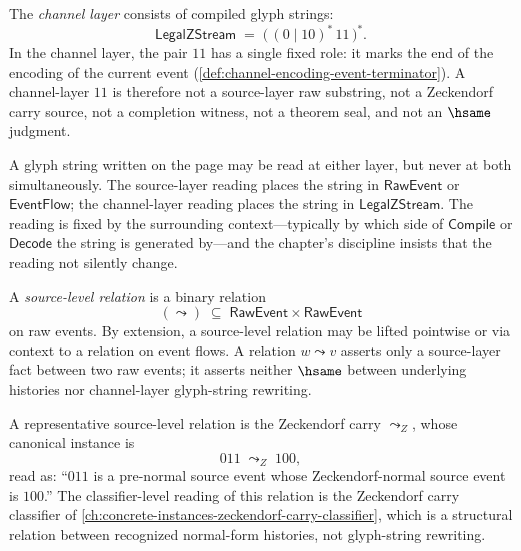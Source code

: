 \begin{definition}
\label{def:source-channel-channel-layer}
The \emph{channel layer} consists of compiled glyph strings:
$$
  \mathsf{LegalZStream} \;=\; \big(\, (0 \mid 10)^{*}\,11 \,\big)^{*}.
$$
In the channel layer, the pair $11$ has a single fixed role: it marks the end of the encoding of the current event (\autoref{def:channel-encoding-event-terminator}). A channel-layer $11$ is therefore not a source-layer raw substring, not a Zeckendorf carry source, not a completion witness, not a theorem seal, and not an $\hsame$ judgment.
\end{definition}

\begin{remark}
\label{rem:source-channel-same-display-different-layers}
A glyph string written on the page may be read at either layer, but never at both simultaneously. The source-layer reading places the string in $\mathsf{RawEvent}$ or $\mathsf{EventFlow}$; the channel-layer reading places the string in $\mathsf{LegalZStream}$. The reading is fixed by the surrounding context---typically by which side of $\mathsf{Compile}$ or $\mathsf{Decode}$ the string is generated by---and the chapter's discipline insists that the reading not silently change.
\end{remark}

\begin{definition}
\label{def:source-channel-source-level-relation}
A \emph{source-level relation} is a binary relation
$$
  (\leadsto) \;\subseteq\; \mathsf{RawEvent} \times \mathsf{RawEvent}
$$
on raw events. By extension, a source-level relation may be lifted pointwise or via context to a relation on event flows. A relation $w \leadsto v$ asserts only a source-layer fact between two raw events; it asserts neither $\hsame$ between underlying histories nor channel-layer glyph-string rewriting.

A representative source-level relation is the Zeckendorf carry $\leadsto_{Z}$, whose canonical instance is
$$
  011 \;\leadsto_{Z}\; 100,
$$
read as: ``$011$ is a pre-normal source event whose Zeckendorf-normal source event is $100$.'' The classifier-level reading of this relation is the Zeckendorf carry classifier of \autoref{ch:concrete-instances-zeckendorf-carry-classifier}, which is a structural relation between recognized normal-form histories, not glyph-string rewriting.
\end{definition}


